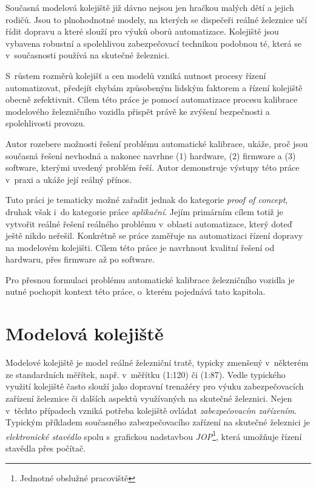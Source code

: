Současná modelová kolejiště již dávno nejsou jen hračkou malých dětí
a jejich rodičů. Jsou to plnohodnotné modely, na kterých se dispečeři reálné
železnice učí řídit dopravu a které slouží pro výuků oborů automatizace.
Kolejiště jsou vybavena robustní a spolehlivou zabezpečovací technikou
podobnou té, která se v~současnosti používá na skutečné železnici.

S~růstem rozměrů kolejišť a cen modelů vzniká nutnost procesy řízení
automatizovat, předejít chybám způsobeným lidským faktorem a řízení kolejiště
obecně zefektivnit. Cílem této práce je pomocí automatizace procesu kalibrace
modelového železničního vozidla přispět právě ke zvýšení bezpečnosti a
spolehlivosti provozu.

Autor rozebere možnosti řešení problému automatické kalibrace, ukáže, proč jsou
současná řešení nevhodná a nakonec navrhne (1) hardware, (2) firmware a (3)
software, kterými uvedený problém řeší. Autor demonstruje výstupy této práce
v~praxi a ukáže její reálný přínos.

Tuto práci je tematicky možné zařadit jednak do kategorie \textit{proof of
concept}, druhak však i~do kategorie práce \textit{aplikační}. Jejím primárním
cílem totiž je vytvořit reálné řešení reálného problému v~oblasti automatizace,
který doteď ještě nikdo neřešil. Konkrétně se práce zaměřuje na automatizaci
řízení dopravy na modelovém kolejišti. Cílem této práce je navrhnout kvalitní
řešení od hardwaru, přes firmware až po software.

Pro přesnou formulaci problému automatické kalibrace železničního vozidla je
nutné pochopit kontext této práce, o~kterém pojednává tato kapitola.

\section{Modelová kolejiště}
\label{sec:mod-kol}

Modelové kolejiště je model reálné železniční tratě, typicky zmenšený
v~některém ze standardních měřítek, např. v~měřítku  (1:120) či 
(1:87). Vedle typického  využití kolejiště často slouží jako dopravní
trenažéry pro výuku zabezpečovacích zařízení železnice či dalších aspektů
využívaných na skutečné železnici. Nejen v~těchto případech vzniká potřeba
kolejiště ovládat \textit{zabezpečovacím zařízením}. Typickým příkladem
současného zabezpečovacího zařízení na skutečné železnici je
\textit{elektronické stavědlo} spolu s~grafickou nadstavbou
\textit{JOP}\footnote{Jednotné obslužné pracoviště}, která umožňuje řízení
stavědla přes počítač.

